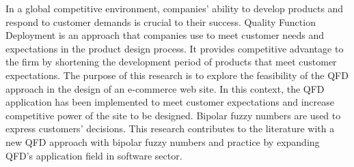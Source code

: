 In a global competitive environment, companies' ability to develop products and respond to customer demands is crucial to their success. Quality Function Deployment is an approach that companies use to meet customer needs and expectations in the product design process. It provides competitive advantage to the firm by shortening the development period of products that meet customer expectations. The purpose of this research is to explore the feasibility of the QFD approach in the design of an e-commerce web site. In this context, the QFD application has been implemented to meet customer expectations and increase competitive power of the site to be designed. Bipolar fuzzy numbers are used to express customers' decisions. This research contributes to the literature with a new QFD approach with bipolar fuzzy numbers and practice by expanding QFD's application field in software sector.

